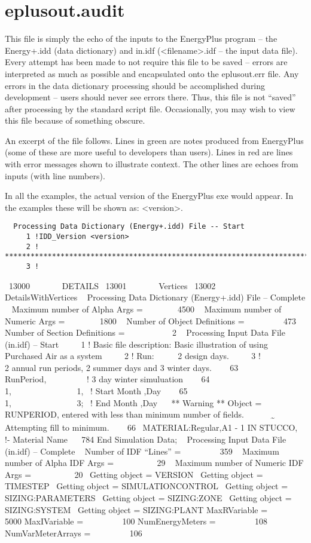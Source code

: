 \section{eplusout.audit}\label{eplusout.audit}

This file is simply the echo of the inputs to the EnergyPlus program -- the Energy+.idd (data dictionary) and in.idf (\textless{}filename\textgreater{}.idf -- the input data file). Every attempt has been made to not require this file to be saved -- errors are interpreted as much as possible and encapsulated onto the eplusout.err file. Any errors in the data dictionary processing should be accomplished during development -- users should never see errors there. Thus, this file is not ``saved'' after processing by the standard script file. Occasionally, you may wish to view this file because of something obscure.

An excerpt of the file follows. Lines in green are notes produced from EnergyPlus (some of these are more useful to developers than users). Lines in red are lines with error messages shown to illustrate context. The other lines are echoes from inputs (with line numbers).

In all the examples, the actual version of the EnergyPlus exe would appear. In the examples these will be shown as: \textless{}version\textgreater{}.

\begin{lstlisting}
  Processing Data Dictionary (Energy+.idd) File -- Start
     1 !IDD_Version <version>
     2 ! **************************************************************************
     3 !
\end{lstlisting}

 ~13000~~~~~~~ \key DETAILS ~13001~~~~~~~ \key Vertices ~13002~~~~~~~ \key DetailsWithVertices ~ Processing Data Dictionary (Energy+.idd) File -- Complete ~ Maximum number of Alpha Args = ~~~~~~~ 4500 ~ Maximum number of Numeric Args = ~~~~~~~ 1800 ~ Number of Object Definitions = ~~~~~~~ ~473 ~ Number of Section Definitions = ~~~~~~~~~~ 2 ~ Processing Input Data File (in.idf) -- Start ~~~~ 1 ! Basic file description: Basic illustration of using Purchased Air as a system ~~~~ 2 ! Run:~~~~~ 2 design days. ~~~~ 3 !~~~~~~~~~~ 2 annual run periods, 2 summer days and 3 winter days. ~~~ 63~~~~ RunPeriod,~~~~~~~~~ ! 3 day winter simuluation ~~~ 64~~~~~~~~~~~~~~ 1,~~~~~~~~~~~~~~~ 1,~ ! Start Month ,Day ~~~ 65~~~~~~~~~~~~~~ 1,~~~~~~~~~~~~~~~ 3;~ ! End Month ,Day ~~ ** Warning ** Object = RUNPERIOD, entered with less than minimum number of fields. ~~ \textbf{~~ \textsubscript{\textasciitilde{}}~~} Attempting fill to minimum. ~~~ 66~ MATERIAL:Regular,A1 - 1 IN STUCCO,~ !- Material Name ~~ 784 End Simulation Data; ~ Processing Input Data File (in.idf) -- Complete ~ Number of IDF ``Lines'' = ~~~~~~~~ 359 ~ Maximum number of Alpha IDF Args = ~~~~~~~~~ 29 ~ Maximum number of Numeric IDF Args = ~~~~~~~~~ 20 ~Getting object = VERSION ~Getting object = TIMESTEP ~Getting object = SIMULATIONCONTROL ~Getting object = SIZING:PARAMETERS ~Getting object = SIZING:ZONE ~Getting object = SIZING:SYSTEM ~Getting object = SIZING:PLANT MaxRVariable = ~~~~~~~ 5000 MaxIVariable = ~~~~~~~~ 100 NumEnergyMeters = ~~~~~~~~ 108 NumVarMeterArrays = ~~~~~~~~ 106
